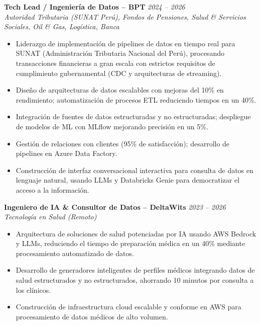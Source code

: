 \textbf{Tech Lead / Ingeniería de Datos – BPT} \hfill \textit{2024 – 2026} \\
\textit{Autoridad Tributaria (SUNAT Perú), Fondos de Pensiones, Salud \& Servicios Sociales, Oil \& Gas, Logística, Banca} \\[-0.6em]
\begin{itemize}[leftmargin=*]
    \item Liderazgo de implementación de pipelines de datos en tiempo real para SUNAT (Administración Tributaria Nacional del Perú), procesando transacciones financieras a gran escala con estrictos requisitos de cumplimiento gubernamental (CDC y arquitecturas de streaming).
    \item Diseño de arquitecturas de datos escalables con mejoras del 10\% en rendimiento; automatización de procesos ETL reduciendo tiempos en un 40\%.
    \item Integración de fuentes de datos estructuradas y no estructuradas; despliegue de modelos de ML con MLflow mejorando precisión en un 5\%.
    \item Gestión de relaciones con clientes (95\% de satisfacción); desarrollo de pipelines en Azure Data Factory.
    \item Construcción de interfaz conversacional interactiva para consulta de datos en lenguaje natural, usando LLMs y Databricks Genie para democratizar el acceso a la información.
\end{itemize}

\vspace{0.1em}

\textbf{Ingeniero de IA \& Consultor de Datos – DeltaWits} \hfill \textit{2023 – 2026} \\
\textit{Tecnología en Salud (Remoto)} \\[-0.6em]
\begin{itemize}[leftmargin=*]
    \item Arquitectura de soluciones de salud potenciadas por IA usando AWS Bedrock y LLMs, reduciendo el tiempo de preparación médica en un 40\% mediante procesamiento automatizado de datos.
    \item Desarrollo de generadores inteligentes de perfiles médicos integrando datos de salud estructurados y no estructurados, ahorrando 10 minutos por consulta a los clínicos.
    \item Construcción de infraestructura cloud escalable y conforme en AWS para procesamiento de datos médicos de alto volumen.
\end{itemize}

